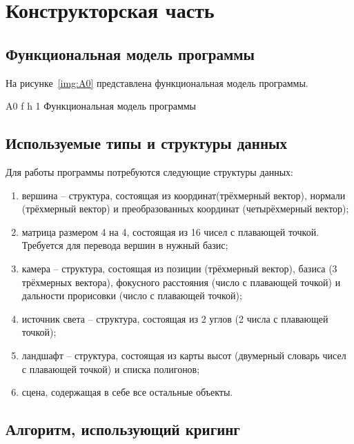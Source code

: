 \chapter{Конструкторская часть}

\section{Функциональная модель программы}

На рисунке~\ref{img:A0} представлена функциональная модель программы.

\FloatBarrier
{}
{A0} %
{f} %
{h} %
{1\textwidth} %
{Функциональная модель программы} %
\FloatBarrier

\section{Используемые типы и структуры данных}

Для работы программы потребуются следующие структуры данных:

\begin{enumerate}
	\item вершина -- структура, состоящая из координат(трёхмерный вектор), нормали (трёхмерный вектор) и преобразованных координат (четырёхмерный вектор);
	\item матрица размером 4 на 4, состоящая из 16 чисел с плавающей точкой. Требуется для перевода вершин в нужный базис;
	\item камера -- структура, состоящая из позиции (трёхмерный вектор), базиса (3 трёхмерных вектора), фокусного расстояния (число с плавающей точкой) и дальности прорисовки (число с плавающей точкой);
	\item источник света -- структура, состоящая из 2 углов (2 числа с плавающей точкой);
	\item ландшафт -- структура, состоящая из карты высот (двумерный словарь чисел с плавающей точкой) и списка полигонов;
	\item сцена, содержащая в себе все остальные объекты.
\end{enumerate}

\section{Алгоритм, использующий кригинг}

